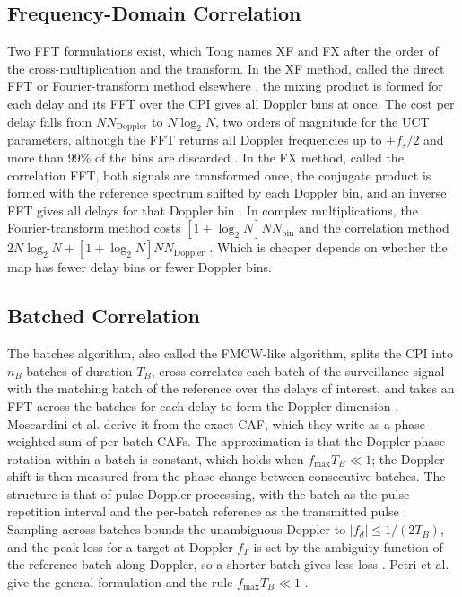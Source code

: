 \subsection{Frequency-Domain Correlation}
\label{subsec:th.ard.freqdomain}
\todo{}
Two FFT formulations exist, which Tong \citep{tong2014} names XF and FX after the order of the cross-multiplication and the transform. In the XF method, called the direct FFT or Fourier-transform method elsewhere \citep{moscardini2015,colone2023}, the mixing product is formed for each delay and its FFT over the CPI gives all Doppler bins at once. The cost per delay falls from $N N_{\mathrm{Doppler}}$ to $N \log_2 N$, two orders of magnitude for the UCT parameters, although the FFT returns all Doppler frequencies up to $\pm f_s / 2$ and more than 99\% of the bins are discarded \citep{tong2014}. In the FX method, called the correlation FFT, both signals are transformed once, the conjugate product is formed with the reference spectrum shifted by each Doppler bin, and an inverse FFT gives all delays for that Doppler bin \citep{tong2014,kuschel2019}. In complex multiplications, the Fourier-transform method costs $[1 + \log_2 N] N N_{\mathrm{bin}}$ and the correlation method $2 N \log_2 N + [1 + \log_2 N] N N_{\mathrm{Doppler}}$ \citep{moscardini2015}. Which is cheaper depends on whether the map has fewer delay bins or fewer Doppler bins.

\subsection{Batched Correlation}
\label{subsec:th.ard.batched}
\todo{}
The batches algorithm, also called the FMCW-like algorithm, splits the CPI into $n_B$ batches of duration $T_B$, cross-correlates each batch of the surveillance signal with the matching batch of the reference over the delays of interest, and takes an FFT across the batches for each delay to form the Doppler dimension \citep{moscardini2015,tong2014}. Moscardini et al. \citep{moscardini2015} derive it from the exact CAF, which they write as a phase-weighted sum of per-batch CAFs. The approximation is that the Doppler phase rotation within a batch is constant, which holds when $f_{\max} T_B \ll 1$; the Doppler shift is then measured from the phase change between consecutive batches. The structure is that of pulse-Doppler processing, with the batch as the pulse repetition interval and the per-batch reference as the transmitted pulse \citep{moscardini2015}. Sampling across batches bounds the unambiguous Doppler to $|f_d| \leq 1 / (2 T_B)$, and the peak loss for a target at Doppler $f_T$ is set by the ambiguity function of the reference batch along Doppler, so a shorter batch gives less loss \citep{moscardini2015}. Petri et al. give the general formulation and the rule $f_{\max} T_B \ll 1$ .

